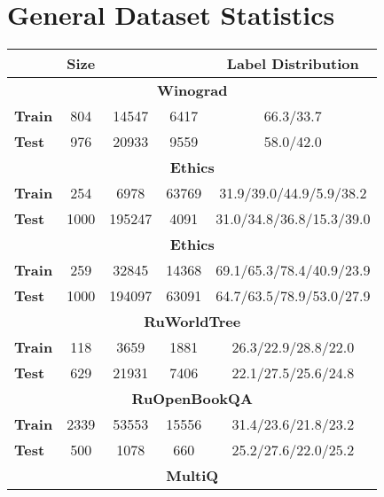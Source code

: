 \documentclass[11pt]{article}
\begin{document}
\clearpage
\newpage

\appendix
\setcounter{figure}{0}
\setcounter{table}{0}


\section{General Dataset Statistics}
\label{app:general_statistics}
\begin{table}[h!]
\centering
\small
\setlength{\tabcolsep}{3pt}
\begin{tabular}{lcccc}
\toprule
      & \bf Size & \bf  & \bf  & \bf Label Distribution               \\ \midrule
      \multicolumn{5}{c}{\textbf{Winograd}}                                     \\ \midrule
\bf Train & 804         & 14547   & 6417           & 66.3/33.7                \\
\bf Test  & 976         & 20933  & 9559          & 58.0/42.0                 \\ \midrule
      \multicolumn{5}{c}{\textbf{Ethics}}                                   \\ \midrule
\bf Train & 254          & 6978   & 63769         & 31.9/39.0/44.9/5.9/38.2  \\
\bf Test  & 1000        & 195247 & 4091          & 31.0/34.8/36.8/15.3/39.0 \\ \midrule
      \multicolumn{5}{c}{\textbf{Ethics}}                                   \\ \midrule
\bf Train & 259          & 32845 & 14368         & 69.1/65.3/78.4/40.9/23.9 \\
\bf Test  & 1000        & 194097 & 63091         & 64.7/63.5/78.9/53.0/27.9 \\ \midrule
      \multicolumn{5}{c}{\textbf{RuWorldTree}}                                    \\ \midrule
\bf Train & 118          & 3659   & 1881          & 26.3/22.9/28.8/22.0       \\
\bf Test  & 629         & 21931  & 7406          & 22.1/27.5/25.6/24.8       \\ \midrule
      \multicolumn{5}{c}{\textbf{RuOpenBookQA}}                                   \\ \midrule
\bf Train & 2339          & 53553  & 15556       & 31.4/23.6/21.8/23.2       \\
\bf Test  & 500         & 1078   & 660           & 25.2/27.6/22.0/25.2       \\ \midrule
     \multicolumn{5}{c}{\textbf{MultiQ}}                                       \\ \midrule

\end{tabular}
\end{table}
\end{document}
